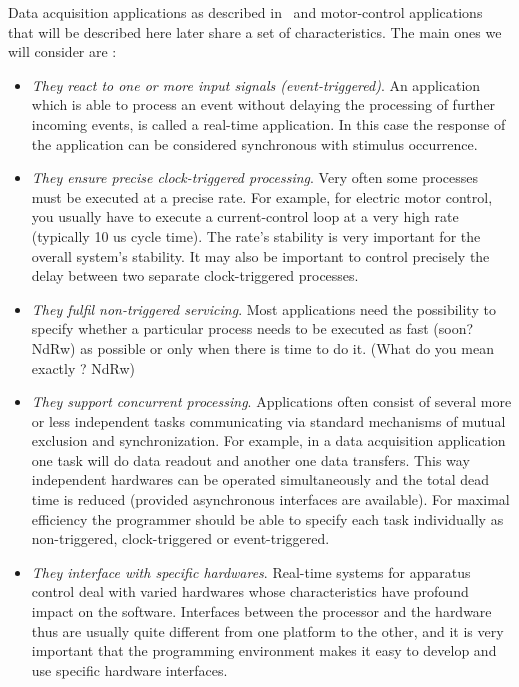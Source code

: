 \documentclass[10pt]{report}
\begin{document}
Data acquisition applications as described in~\cite{Delchini:95} and 
motor-control applications that will be described here later 
share a set of characteristics. The main ones we will consider 
are :

\begin{itemize}

\item {\em They react to one or more input signals (event-triggered)}. An 
  application which is able to process an event without delaying 
  the processing of further incoming events, is called a 
  real-time application. In this case the response of the 
  application can be considered synchronous with stimulus 
  occurrence.

\item {\em They ensure precise clock-triggered processing}. Very often 
  some processes must be executed at a precise rate. For example, 
  for electric motor control, you usually have to execute a 
  current-control loop at a very high rate (typically 10 us cycle 
  time). The rate's stability is very important for the overall 
  system's stability. It may also be important to control 
  precisely the delay between two separate clock-triggered 
  processes.

\item {\em They fulfil non-triggered servicing}. Most applications need 
  the possibility to specify whether a particular process needs 
  to be executed as fast (soon? NdRw) as possible or only when 
  there is time to do it. (What do you mean exactly ? NdRw)

\item {\em They support concurrent processing}. Applications often consist 
  of several more or less independent tasks communicating via 
  standard mechanisms of mutual exclusion and synchronization. 
  For example, in a data acquisition application one task will do 
  data readout and another one data transfers. This way 
  independent hardwares can be operated simultaneously and the 
  total dead time is reduced (provided asynchronous interfaces 
  are available). For maximal efficiency the programmer should be 
  able to specify each task individually as non-triggered, 
  clock-triggered or event-triggered.

\item {\em They interface with specific hardwares}. Real-time systems for 
  apparatus control deal with varied hardwares whose 
  characteristics have profound impact on the software. 
  Interfaces between the processor and the hardware thus are 
  usually quite different from one platform to the other, and it 
  is very important that the programming environment makes it 
  easy to develop and use specific hardware interfaces.

\end{itemize}
\end{document}
